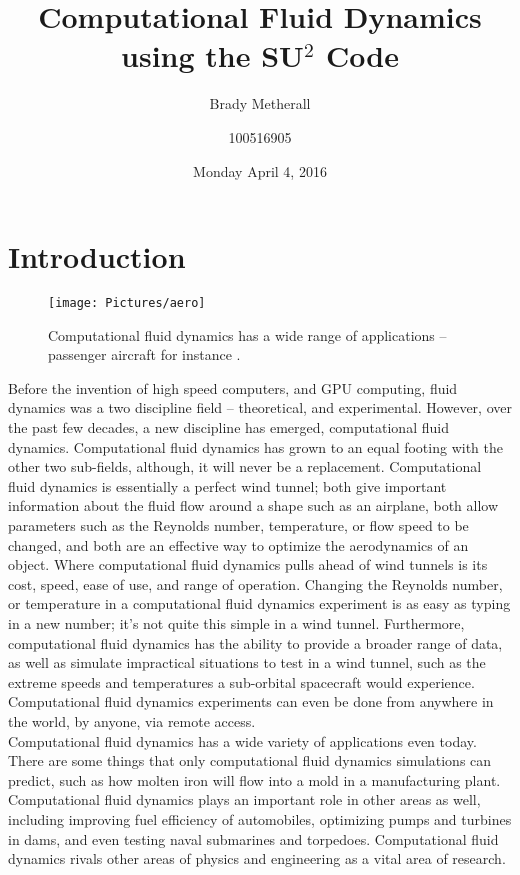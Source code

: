 \documentclass[10pt, titlepage]{article}
\title{Computational Fluid Dynamics \\ \large using the SU$^2$ Code}
\author{Brady Metherall \and 100516905}
\date{Monday April 4, 2016}
\makeatletter
\let\tohe@listfig\relax
\let\tohe@listtab\relax
\let\tohe@listoffigtab\listoffigtab
\def\listoffigtab{%
  \begingroup
  \def\tohe@listfig{Fig.~}
  \def\tohe@listtab{Tab.~}
  \tohe@listoffigtab
  \endgroup  
}
\makeatother
\begin{document}
\maketitle
\setlength\parindent{0pt}
\lstset{language=myMMA}

\listoffigtab

\section{Introduction}

\begin{wrapfigure}{R}{0.45\textwidth}
\centering
\texttt{[image: Pictures/aero]}
\caption[Example of Computational Fluid Dynamics Applications]{Computational fluid dynamics has a wide range of applications -- passenger aircraft for instance \cite{aeroplane}.}
\label{fig:aeroplane}
\end{wrapfigure}

Before the invention of high speed computers, and GPU computing, fluid dynamics was a two discipline field -- theoretical, and experimental. However, over the past few decades, a new discipline has emerged, computational fluid dynamics. Computational fluid dynamics has grown to an equal footing with the other two sub-fields, although, it will never be a replacement.  Computational fluid dynamics is essentially a perfect wind tunnel; both give important information about the fluid flow around a shape such as an airplane, both allow parameters such as the Reynolds number, temperature, or flow speed to be changed, and both are an effective way to optimize the aerodynamics of an object. Where computational fluid dynamics pulls ahead of wind tunnels is its cost, speed, ease of use, and range of operation. Changing the Reynolds number, or temperature in a computational fluid dynamics experiment is as easy as typing in a new number; it's not quite this simple in a wind tunnel. Furthermore, computational fluid dynamics has the ability to provide a broader range of data, as well as simulate impractical situations to test in a wind tunnel, such as the extreme speeds and temperatures a sub-orbital spacecraft would experience. Computational fluid dynamics experiments can even be done from anywhere in the world, by anyone, via remote access. \\

Computational fluid dynamics has a wide variety of applications even today. There are some things that only computational fluid dynamics simulations can predict, such as how molten iron will flow into a mold in a manufacturing plant. Computational fluid dynamics plays an important role in other areas as well, including improving fuel efficiency of automobiles, optimizing pumps and turbines in dams, and even testing naval submarines and torpedoes. Computational fluid dynamics rivals other areas of physics and engineering as a vital area of research. \\
\end{document}
